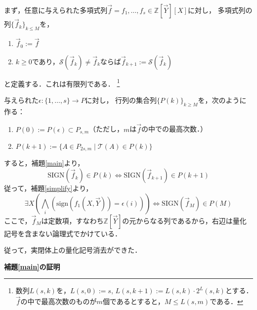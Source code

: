 \documentclass[uplatex, dvipdfmx]{jsarticle}
\makeatletter
\renewenvironment{proof}[1][\proofname]{\par
  \pushQED{\qed}%
  \normalfont \topsep6\p@\@plus6\p@\relax
  \trivlist
  \item\relax
  {\bfseries
  #1\@addpunct{.}}\hspace\labelsep\ignorespaces
}{%
  \popQED\endtrivlist\@endpefalse
}
\newcommand{\sign}{\mathrm{sign}}
\newcommand{\SIGN}{\mathrm{SIGN}}
\newcommand{\Z}{\mathbb{Z}}
\newcommand{\map}[3]{{#1}:{#2}\rightarrow{#3}}
\theoremstyle{definition}
\renewcommand{\proofname}{\textbf{証明}}
\makeatother
\begin{document}
まず，任意に与えられた多項式列$\vec{f} = f_1, \dots, f_s \in \Z[\vec{Y}][X]$に対し，
多項式列の列$\{\vec{f}_k\}_{k\leq M}$を，
\begin{enumerate}
    \item $\vec{f}_0 := \vec{f}$
    \item $k \geq 0$であり，$\mathcal{S}(\vec{f}_k) \neq \vec{f}_k$ならば$\vec{f}_{k+1}:=\mathcal{S}(\vec{f}_k)$
\end{enumerate}
と定義する．これは有限列である．
\footnote{数列$L(s,k)$を，$L(s,0):=s$, $L(s,k+1):=L(s,k)\cdot 2^L(s,k)$とする．
    $\vec{f}$の中で最高次数のものが$m$個であるとすると，$M \leq L(s,m)$である．}

与えられた$\map{\epsilon}{\{1,\dots,s\}}{P}$に対し，
行列の集合列$\{P(k)\}_{k \geq M}$を，次のように作る：
\begin{enumerate}
    \item $P(0):= P(\epsilon) \subset P_{s,m}$（ただし，$m$は$\vec{f}$の中での最高次数．）
    \item $P(k+1):=\{A \in P_{2s,m} \mid \mathcal{T}(A) \in P(k)\}$
\end{enumerate}

すると，補題\ref{main}より，
\[
    \SIGN(\vec{f}_k) \in P(k) \iff \SIGN(\vec{f}_{k+1}) \in P(k+1)
\]
従って，補題\ref{simplify}より，
\[
    \exists X (\bigwedge_i(\sign(f_1(X,\vec{Y}))=\epsilon(i))) \iff \SIGN(\vec{f}_M) \in P(M)
\]
ここで，$\vec{f}_M$は定数項，すなわち$\Z[\vec{Y}]$の元からなる列であるから，右辺は量化記号を含まない論理式でかけている．

従って，実閉体上の量化記号消去ができた．

\begin{proof}[補題\ref{main}の証明]
\end{proof}
\end{document}
